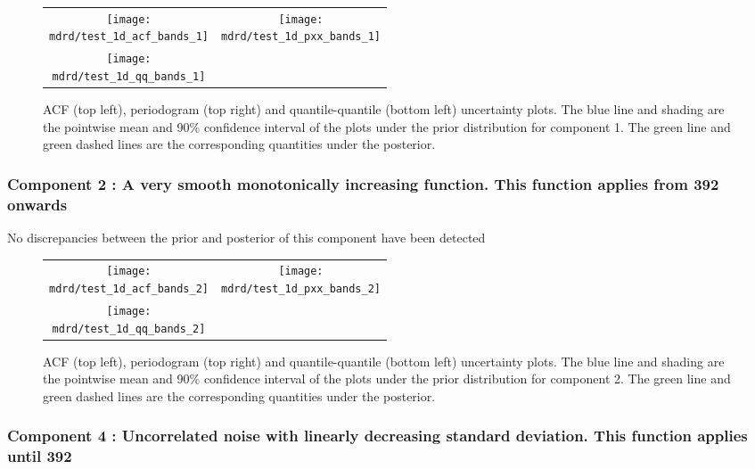 \documentclass{article} %
\begin{document}
\begin{figure}[H]
\newcommand{\wmgd}{0.5\columnwidth}
\newcommand{\hmgd}{3.0cm}
\newcommand{\mdrd}{test_1d}
\newcommand{\mbm}{\hspace{-0.3cm}}
\begin{tabular}{cc}
\mbm \texttt{[image: \\mdrd/test\_1d\_acf\_bands\_1]} & \texttt{[image: \\mdrd/test\_1d\_pxx\_bands\_1]} \\
\mbm \texttt{[image: \\mdrd/test\_1d\_qq\_bands\_1]}
\end{tabular}
\caption{
ACF (top left), periodogram (top right) and quantile-quantile (bottom left) uncertainty plots.
The blue line and shading are the pointwise mean and 90\% confidence interval of the plots under the prior distribution for component 1.
The green line and green dashed lines are the corresponding quantities under the posterior.}
\label{fig:check1}
\end{figure}

\subsubsection{Component 2 : A very smooth monotonically increasing function. This function applies from  392 onwards}

No discrepancies between the prior and posterior of this component have been detected

\begin{figure}[H]
\newcommand{\wmgd}{0.5\columnwidth}
\newcommand{\hmgd}{3.0cm}
\newcommand{\mdrd}{test_1d}
\newcommand{\mbm}{\hspace{-0.3cm}}
\begin{tabular}{cc}
\mbm \texttt{[image: \\mdrd/test\_1d\_acf\_bands\_2]} & \texttt{[image: \\mdrd/test\_1d\_pxx\_bands\_2]} \\
\mbm \texttt{[image: \\mdrd/test\_1d\_qq\_bands\_2]}
\end{tabular}
\caption{
ACF (top left), periodogram (top right) and quantile-quantile (bottom left) uncertainty plots.
The blue line and shading are the pointwise mean and 90\% confidence interval of the plots under the prior distribution for component 2.
The green line and green dashed lines are the corresponding quantities under the posterior.}
\label{fig:check2}
\end{figure}

\subsubsection{Component 4 : Uncorrelated noise with linearly decreasing standard deviation. This function applies until  392}
\end{document}
